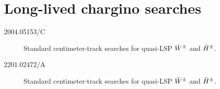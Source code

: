 \section[Long-lived chargino searches]{Long-lived chargino searches}
\begin{description}
\item[2004.05153/C] Standard centimeter-track searches for quasi-LSP $\tilde W^{\pm}$ and $\tilde H^{\pm}$.
\item[2201.02472/A] Standard centimeter-track searches for quasi-LSP $\tilde W^{\pm}$ and $\tilde H^{\pm}$.
\end{description}









